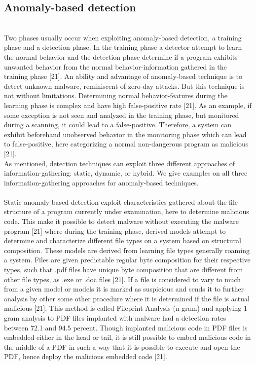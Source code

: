 \documentclass[12pt]{article} %
\begin{document}
\subsection{Anomaly-based detection}
\\
Two phases usually occur when exploiting anomaly-based detection, a training phase and a detection phase. In the training phase a detector attempt to learn the normal behavior and the detection phase determine if a program exhibits unwanted behavior from the normal behavior-information gathered in the training phase [21]. An ability and advantage of anomaly-based technique is to detect unknown malware, reminiscent of zero-day attacks. But this technique is not without limitations. Determining normal behavior-features during the learning phase is complex and have high false-positive rate [21]. As an example, if some exception is not seen and analyzed in the training phase, but monitored during a scanning, it could lead to a false-positive. Therefore, a system can exhibit beforehand unobserved behavior in the monitoring phase which can lead to false-positive, here categorizing a normal non-dangerous program as malicious [21]. \\
As mentioned, detection techniques can exploit three different approaches of information-gathering: static, dynamic, or hybrid. We give examples on all three information-gathering approaches for anomaly-based techniques. \\ \\
Static anomaly-based detection exploit characteristics gathered about the file structure of a program currently under examination, here to determine malicious code. This make it possible to detect malware without executing the malware program [21] where during the training phase, derived models attempt to determine and characterize different file types on a system  based on structural composition. These models are derived from learning file types generally roaming a system. Files are given predictable regular byte composition for their respective types, such that .pdf files have unique byte composition that are different from other file types, as .exe or .doc files [21]. If a file is considered to vary to much from a given model or models it is marked as suspicious and sends it to further analysis by other some other procedure where it is determined if the file is actual malicious [21]. This method is called Fileprint Analysis (n-gram) and applying 1-gram analysis to PDF files implanted with malware had a detection rates between 72.1 and 94.5 percent. Though implanted malicious code in PDF files is embedded either in the head or tail, it is still possible to embed malicious code in the middle of a PDF in such a way that it is possible to execute and open the PDF, hence deploy the malicious embedded code [21]. \\
\end{document}
